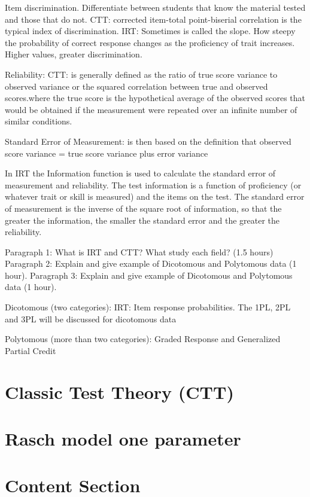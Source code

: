 \documentclass[12pt]{article}
\begin{document}
Item discrimination. Differentiate between students that know the material tested and those that do not. CTT: corrected item-total point-biserial correlation is the typical index of discrimination. IRT: Sometimes is called the slope. How steepy the probability of correct response changes as the proficiency of trait increases. Higher values, greater discrimination.

Reliability: CTT: is generally defined as the ratio of true score variance to observed variance or the squared correlation between true and observed scores.where the true score is the hypothetical average of the observed scores that would be obtained if the measurement were repeated over an infinite number of similar conditions.

Standard Error of Measurement: is then based on the definition that observed score variance = true score variance plus error variance 


In IRT the Information function is used to calculate the standard error of measurement and reliability. The test information is a function of proficiency (or whatever trait or skill is measured) and the items on the test. The standard error of measurement is the inverse of the square root of information, so that the greater the information, the smaller the standard error and the greater the reliability.

Paragraph 1: What is IRT and CTT? What study each field? (1.5 hours)
Paragraph 2: Explain and give example of Dicotomous and Polytomous data (1 hour).
Paragraph 3: Explain and give example of Dicotomous and Polytomous data (1 hour).

Dicotomous (two categories):
IRT: Item response probabilities. The 1PL, 2PL and 3PL will be discussed for dicotomous data

Polytomous (more than two categories):
Graded Response and Generalized Partial Credit

\section{Classic Test Theory (CTT)}

\section{Rasch model one parameter}


\section{Content Section}
\end{document}
